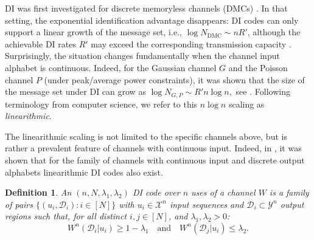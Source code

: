 \documentclass[10pt, conference]{IEEEtran}
\newtheorem{definition}[theorem]{Definition}
\newcommand{\1}{\mathds{1}}
\newcommand{\cD}{\mathcal{D}}
\newcommand{\cX}{\mathcal{X}}
\newcommand{\cY}{\mathcal{Y}}
\begin{document}
DI was first investigated for discrete memoryless channels (DMCs) \cite{AC:DI,SPBD:DI_power}. In that setting, the exponential identification advantage disappears: DI codes can only support a linear growth of the message set, i.e.,
$\log N_{\text{DMC}}\sim nR'$,
although the achievable DI rates $R'$ may exceed the corresponding transmission capacity \cite{SPBD:DI_power}. 
Surprisingly, the situation changes fundamentally when the channel input alphabet is continuous. Indeed, for the Gaussian channel $G$ and the Poisson channel $P$ (under peak/average power constraints), it was shown that the size of the message set under DI can grow as
\(
\log N_{G,P} \sim R' n\log n,
\)
see \cite{SPBD:DI_power, DI-fading, RRGauss-arXiv, DI-poisson_mc}. Following terminology from computer science, we refer to this $n\log n$ scaling as \emph{linearithmic}.

The linearithmic scaling is not limited to the specific channels above, but is rather a prevalent feature of channels with continuous input. Indeed, in \cite{CDBW:DI_classical,CDBW:Reliability-TCOM}, it was shown that for the family of channels with continuous input and discrete output alphabets linearithmic DI codes also exist. 

\begin{definition}\label{def:DI_code}
An $(n,N,\lambda_1,\lambda_2)$ DI code over $n$ uses of a channel $W$ is a family of pairs $\{(u_i,\cD_i) : i\in[N]\}$ with $u_i\in\cX^n$ input sequences and $\cD_i\subset\cY^n$ output regions such that, for all distinct $i, j\in [N]$, and $\lambda_1,\lambda_2>0$:
\[
  W^n(\cD_i|u_i)\ge 1-\lambda_1 \quad\text{and}\quad W^n(\cD_j|u_i)\le\lambda_2.
\]
\end{definition}
\end{document}
